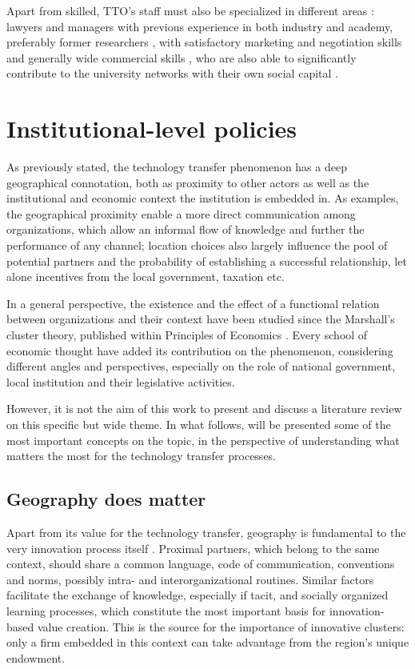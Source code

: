Apart from skilled, TTO's staff must also be specialized in different areas \citep{Guerrero2014}: lawyers and managers with previous experience in both industry and academy, preferably former researchers \citep{Debackere2005}, with satisfactory marketing and negotiation skills \citep{Siegel2003a} and generally wide commercial skills \citep{Siegel2007}, who are also able to significantly contribute to the university networks with their own social capital \citep{Geuna2009}.

\section{Institutional-level policies}

As previously stated, the technology transfer phenomenon has a deep geographical connotation, both as proximity to other actors as well as the institutional and economic context the institution is embedded in. As examples, the geographical proximity enable a more direct communication among organizations, which allow an informal flow of knowledge and further the performance of any channel; location choices also largely influence the pool of potential partners and the probability of establishing a successful relationship, let alone incentives from the local government, taxation etc.

In a general perspective, the existence and the effect of a functional relation between organizations and their context have been studied since the Marshall's cluster theory, published within Principles of Economics \citep{Marshall1890}. Every school of economic thought have added its contribution on the phenomenon, considering different angles and perspectives, especially on the role of national government, local institution and their legislative activities.

However, it is not the aim of this work to present and discuss a literature review on this specific but wide theme. In what follows, will be presented some of the most important concepts on the topic, in the perspective of understanding what matters the most for the technology transfer processes.

\subsection{Geography does matter}

Apart from its value for the technology transfer, geography is fundamental to the very innovation process itself \citep{Asheim2009}. Proximal partners, which belong to the same context, should share a common language, code of communication, conventions and norms, possibly intra- and interorganizational routines. Similar factors facilitate the exchange of knowledge, especially if tacit, and socially organized learning processes, which constitute the most important basis for innovation-based value creation. This is the source for the importance of innovative clusters: only a firm embedded in this context can take advantage from the region's unique endowment. 

